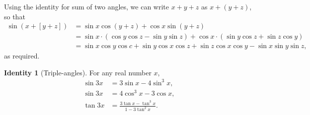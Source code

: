 \documentclass[12pt,a4paper]{memoir}
\theoremstyle{definition}
\newtheorem{identity}{Identity}
\begin{document}
\begin{solution}[name=Proof of Sum of Three Angles Identity]
	Using the identity for sum of two angles, we can write $x+y+z$ as $x+(y+z)$, so that
	\begin{align*}
		\sin(x+[y+z]) &=\sin x \cos(y+z) + \cos x \sin(y+z)\\
		&= \sin x \cdot \left(\cos y\cos z - \sin y \sin z\right) + \cos x \cdot \left(\sin y \cos z + \sin z \cos y\right)\\
		&= \sin x \cos y \cos c + \sin y \cos x \cos z + \sin z \cos x \cos y - \sin x \sin y \sin z,
	\end{align*}
	as required.
\end{solution}

\begin{tcolorbox}[title={Triple--Angle Identities}]
	\begin{identity}[Triple-angles]
		For any real number $x$,
		\begin{align}
			\sin 3x &= 3\sin x - 4\sin^3 x,\\
			\sin 3x &= 4\cos^3 x - 3\cos x,\\
			\tan 3x &= \frac{3\tan x - \tan^3 x}{1 - 3\tan^2 x}.
		\end{align}
	\end{identity}
\end{tcolorbox}
\end{document}
